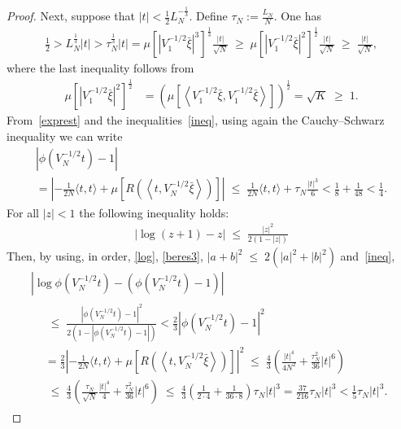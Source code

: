 \documentclass[10pt,a4paper]{article}
\renewcommand{\leq}{\;\leqslant\;}
\renewcommand{\geq}{\;\geqslant\;}
\newcommand{\scalar}[2]{\langle #1, #2\rangle}
\begin{document}
\begin{proof}
Next, suppose that $|t|< \frac{1}{2}L_N^{-\frac{1}{3}}.$ Define $\tau_N := \frac{L_N}{N}.$ One has
\begin{align}\label{ineq}
\frac{1}{2}>L_N^{\frac{1}{3}}|t|>\tau_N^{\frac{1}{3}}|t|=\mu\left[\left|V_1^{-1/2}\bar{\xi}\right|^3\right]^{\frac{1}{3}}\frac{|t|}{\sqrt{N}}\geq \mu\left[\left|V_1^{-1/2}\bar{\xi}\right|^2\right]^{\frac{1}{2}}\frac{|t|}{\sqrt{N}}\geq \frac{|t|}{\sqrt{N}},
\end{align}
where the last inequality follows from
\begin{align}
\mu\left[\left|V_1^{-1/2}\bar{\xi}\right|^2\right]^{\frac{1}{2}} &= \left(\mu\left[\left\langle V_1^{-1/2}\bar{\xi}, V_1^{-1/2}\bar{\xi}\right\rangle \right]\right)^{\frac{1}{2}} = \sqrt{K}\geq 1.
\end{align}
From~\eqref{exprest} and the inequalities~\eqref{ineq}, using again the Cauchy--Schwarz inequality we can write
\begin{multline}\label{beres3}
\left|\phi\left(V_N^{-1/2}t\right)-1\right|
\\
= \left|-\frac1{2N}\scalar{t}{t} + \mu\left[R\left(\left\langle t,V_N^{-1/2}\bar{\xi}\right\rangle\right)\right]\right| \leq \frac{1}{2N}\scalar{t}{t} + \tau_N\frac{|t|^3}{6} < \frac{1}{8}+\frac{1}{48}<\frac{1}{4}.
\end{multline}
For all $|z|<1$ the following inequality holds:
\begin{align}\label{log}
\left|\log(z+1)-z\right| \leq \frac{|z|^2}{2(1-|z|)}
\end{align}
Then, by using, in order, \eqref{log}, \eqref{beres3}, $|a+b|^2\leq2(|a|^2+|b|^2)$ and~\eqref{ineq},
\begin{multline}
\left|\log\phi\left(V_N^{-1/2}t\right)-\left(\phi\left(V_N^{-1/2}t\right)-1\right)\right|\\
\begin{aligned}
&\leq \frac{\left|\phi\left(V_N^{-1/2}t\right)-1\right|^2}{2\left(1-\left|\phi\left(V_N^{-1/2}t\right)-1\right|\right)} <\frac{2}{3}\left|\phi\left(V_N^{-1/2}t\right)-1\right|^2 \\
&=\frac{2}{3}\left|-\frac{1}{2N}\scalar{t}{t} +\mu\left[R\left(\left\langle t,V_N^{-1/2}\bar{\xi}\right\rangle \right)\right] \right|^2 \leq \frac{4}{3}\left(\frac{|t|^4}{4N^2}+ \frac{\tau_{N}^2}{36}|t|^6\right) \\
&\leq \frac{4}{3}\left(\frac{\tau_N}{\sqrt{N}}\frac{|t|^4}{4} + \frac{\tau_{N}^2}{36}|t|^6\right) \leq \frac{4}{3}\left(\frac{1}{2\cdot4}+\frac{1}{36\cdot8}\right)\tau_N|t|^3 =\frac{37}{216}\tau_N|t|^3 < \frac{1}{5}\tau_N|t|^3.

\end{aligned}
\end{multline}
\end{proof}
\end{document}
